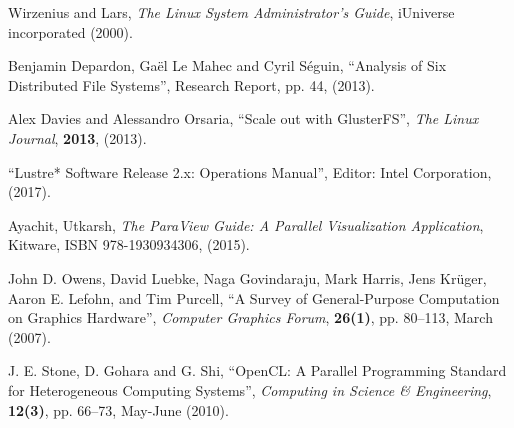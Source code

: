 \documentclass[twoside,a4paper,12pt,english]{inac17}
\begin{document}
\begin{thebibliography}{99}
 Wirzenius and Lars, \textit{The  Linux System Administrator's Guide}, iUniverse incorporated (2000).

 Benjamin Depardon, Ga\"{e}l Le Mahec and Cyril S\'{e}guin, ``Analysis of Six Distributed File Systems'', Research Report, pp. 44, (2013).
  
 Alex Davies and Alessandro Orsaria, ``Scale out with GlusterFS'', \textit{The Linux Journal}, \textbf{2013}, (2013).

 ``Lustre* Software Release 2.x: Operations Manual'', Editor: Intel Corporation, (2017).

 Ayachit, Utkarsh, \textit{The ParaView Guide: A Parallel Visualization Application}, Kitware, ISBN 978-1930934306, (2015).

    John D. Owens, David Luebke, Naga Govindaraju, Mark Harris, Jens Kr\"{u}ger, Aaron E. Lefohn, and Tim Purcell, ``A Survey of General-Purpose Computation on Graphics Hardware'', \textit{Computer Graphics Forum}, \textbf{26(1)}, pp. 80--113, March (2007).

   J. E. Stone, D. Gohara and G. Shi, ``OpenCL: A Parallel Programming Standard for Heterogeneous Computing Systems'', \textit{Computing in Science \& Engineering}, \textbf{12(3)}, pp. 66--73, May-June (2010).

\end{thebibliography}

%
%
\end{document}
